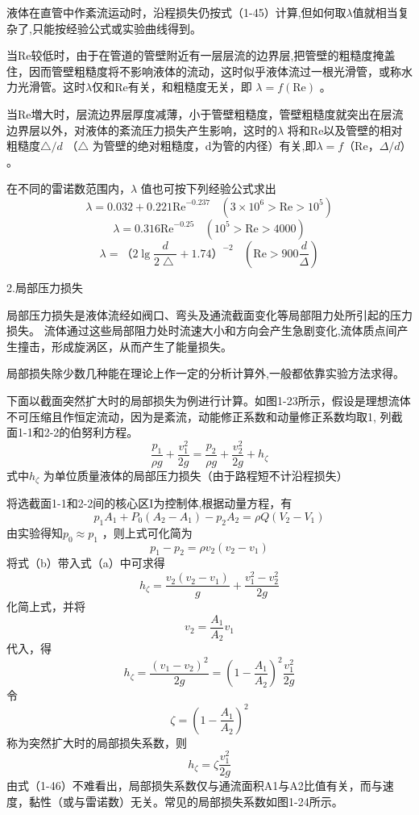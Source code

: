 
液体在直管中作紊流运动时，沿程损失仍按式（1-45）计算,但如何取$ \lambda  $值就相当复杂了,只能按经验公式或实验曲线得到。

当Re较低时，由于在管道的管壁附近有一层层流的边界层,把管壁的粗糙度掩盖住，因而管壁粗糙度将不影响液体的流动，这时似乎液体流过一根光滑管，或称水力光滑管。这时$ \lambda  $仅和Re有关，和粗糙度无关，即 $ \lambda =f\left( \text{Re} \right)  $ 。

当Re増大时，层流边界层厚度减薄，小于管壁粗糙度，管壁粗糙度就突出在层流边界层以外，对液体的紊流压力损失产生影响，这时的$ \lambda  $ 将和Re以及管壁的相对粗糙度$ \bigtriangleup /d $ （$ \bigtriangleup  $ 为管壁的绝对粗糙度，d为管的内径）有关,即$ \lambda =f\text{（Re，}\varDelta /d\text{）} $。

在不同的雷诺数范围内，$ \lambda  $ 值也可按下列经验公式求出
$$ \lambda =0.032+0.221\text{Re}^{-0.237}\ \ \ \ \left( 3\times 10^6>\text{Re}>10^5 \right)  $$ 
$$ \lambda =0.316\text{Re}^{-0.25}\ \ \ \ \left( 10^5>\text{Re}>4000 \right)  $$ 
$$ \lambda =\text{（2}\lg \frac{d}{2\bigtriangleup}+1.74\text{）}^{-2}\ \ \ \ \left( \text{Re}>900\frac{d}{\varDelta} \right)  $$ 

2.局部压力损失

局部压力损失是液体流经如阀口、弯头及通流截面变化等局部阻力处所引起的压力损失。 流体通过这些局部阻力处时流速大小和方向会产生急剧变化,流体质点间产生撞击，形成旋涡区，从而产生了能量损失。

局部损失除少数几种能在理论上作一定的分析计算外,一般都依靠实验方法求得。

下面以截面突然扩大时的局部损失为例进行计算。如图1-23所示，假设是理想流体不可压缩且作恒定流动，因为是紊流，动能修正系数和动量修正系数均取1, 列截面1-1和2-2的伯努利方程。
$$ \frac{p_1}{\rho g}+\frac{v_{1}^{2}}{2g}=\frac{p_2}{\rho g}+\frac{v_{2}^{2}}{2g}+h_{\zeta} $$ 
式中$ h_{\zeta} $ 为单位质量液体的局部压力损失（由于路程短不计沿程损失）

将选截面1-1和2-2间的核心区I为控制体,根据动量方程，有
$$ p_1A_1+P_0\left( A_2-A_1 \right) -p_2A_2=\rho Q\left( V_2-V_1 \right)  $$
\noindent 由实验得知$ p_0\approx p_1 $ ，则上式可化简为
$$ p_1-p_2=\rho v_2\left( v_2-v_1 \right)  $$ 
\noindent 将式（b）带入式（a）中可求得
$$ h_{\zeta}=\frac{v_2\left( v_2-v_1 \right)}{g}+\frac{v_{1}^{2}-v_{2}^{2}}{2g} $$ 
\noindent 化简上式，并将$$ v_2=\frac{A_1}{A_2}v_1 $$ 代入，得
$$ h_{\zeta}=\frac{\left( v_1-v_2 \right) ^2}{2g}=\left( 1-\frac{A_1}{A_2} \right) ^2\frac{v_{1}^{2}}{2g} $$ 
\noindent 令
$$ \zeta =\left( 1-\frac{A_1}{A_2} \right) ^2 $$ 
\noindent 称为突然扩大时的局部损失系数，则
$$ h_{\zeta}=\zeta \frac{v_{1}^{2}}{2g} $$
由式（1-46）不难看出，局部损失系数仅与通流面积A1与A2比值有关，而与速度，黏性（或与雷诺数）无关。常见的局部损失系数如图1-24所示。

